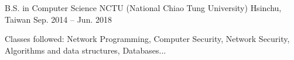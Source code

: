

\begin{cventries}

  \cventry
    {B.S. in Computer Science} %
    {NCTU (National Chiao Tung University)} %
    {Hsinchu, Taiwan} %
    {Sep. 2014 -- Jun. 2018} %
    {
      \begin{cvitems} %
        \item {Classes followed: Network Programming, Computer Security, Network Security, Algorithms and data structures, Databases...}
      \end{cvitems}
    }

\end{cventries}
